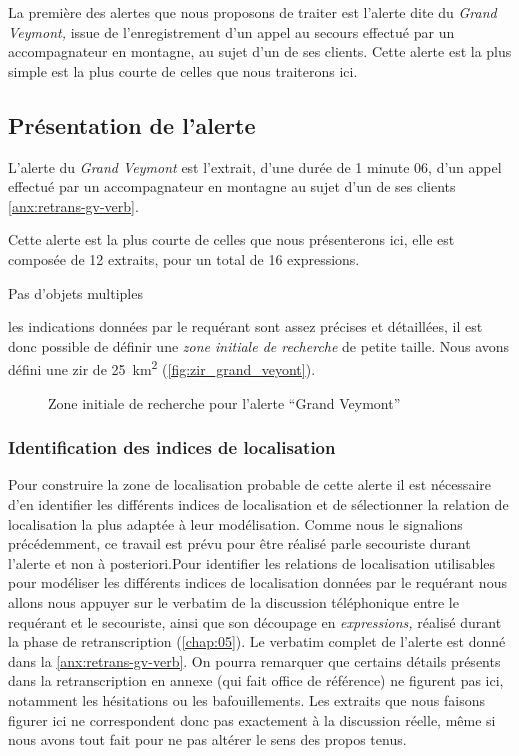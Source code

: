 La première des alertes que nous proposons de traiter est l'alerte
dite du \emph{Grand Veymont,} issue de l'enregistrement d'un appel au
secours effectué par un accompagnateur en montagne, au sujet d'un de
ses clients.
%
Cette alerte est la plus simple est la plus courte de celles que nous
traiterons ici.

\subsection{Présentation de l'alerte}
\label{subsec:9-2-1}

L'alerte du \emph{Grand Veymont} est l'extrait, d'une durée de 1
minute 06, d'un appel effectué par un accompagnateur en montagne au
sujet d'un de ses clients \autoref{anx:retrans-gv-verb}.


Cette alerte est la plus courte de celles que nous présenterons ici,
elle est composée de 12 extraits, pour un total de 16 expressions.



Pas d'objets multiples

les indications données par le requérant sont assez précises et
détaillées, il est donc possible de définir une \emph{zone initiale de
  recherche} de petite taille. Nous avons défini une \ac{zir} de
\SI{25}{\kilo\meter\squared} (\autoref{fig:zir_grand_veyont}).

\begin{figure}
  \centering
  
  \caption{Zone initiale de recherche pour l'alerte \enquote{Grand Veymont}}
  \label{fig:zir_grand_veyont}
\end{figure}


\subsubsection{Identification des indices de localisation}
\label{subsec:9-2-1-1}


Pour construire la zone de localisation probable de cette alerte il
est nécessaire d'en identifier les différents indices de localisation
et de sélectionner la relation de localisation la plus adaptée à leur
modélisation. Comme nous le signalions précédemment, ce travail est
prévu pour être réalisé parle secouriste durant l'alerte et non à
posteriori.Pour identifier les relations de localisation utilisables
pour modéliser les différents indices de localisation données par le
requérant nous allons nous appuyer sur le verbatim de la discussion
téléphonique entre le requérant et le secouriste, ainsi que son
découpage en \emph{expressions,} réalisé durant la phase de
retranscription (\autoref{chap:05}). Le verbatim complet de l'alerte
est donné dans la \autoref{anx:retrans-gv-verb}. On pourra remarquer
que certains détails présents dans la retranscription en annexe (qui
fait office de référence) ne figurent pas ici, notamment les
hésitations ou les bafouillements. Les extraits que nous faisons
figurer ici ne correspondent donc pas exactement à la discussion
réelle, même si nous avons tout fait pour ne pas altérer le sens des
propos tenus.

